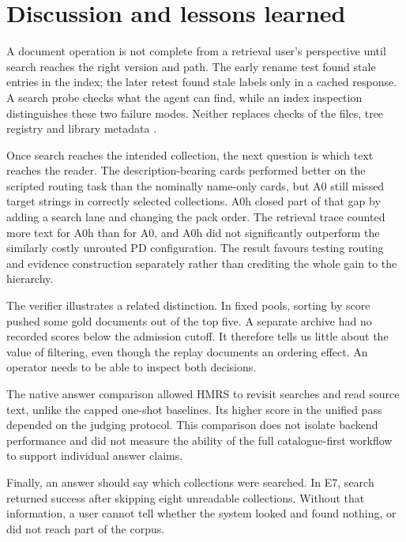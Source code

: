 \section{Discussion and lessons learned}
\label{sec:discussion}
A document operation is not complete from a retrieval user's perspective
until search reaches the right version and path. The early rename test
found stale entries in the index; the later retest found stale labels only
in a cached response. A search probe checks what the agent can find, while
an index inspection distinguishes these two failure modes. Neither
replaces checks of the files, tree registry and library metadata
\citep{park-metadata-quality-2009,paivarinta-ecm-2005}.

Once search reaches the intended collection, the next question is which
text reaches the reader. The description-bearing cards performed better
on the scripted routing task than the nominally name-only cards, but A0
still missed target strings in correctly selected collections. A0h closed
part of that gap by adding a search lane and changing the pack order. The
retrieval trace counted more text for A0h than for A0, and A0h did not
significantly outperform the similarly costly unrouted PD configuration.
The result favours testing
routing and evidence construction separately rather than crediting the
whole gain to the hierarchy.

The verifier illustrates a related distinction. In fixed pools, sorting by
score pushed some gold documents out of the top five. A separate archive
had no recorded scores below the admission cutoff. It therefore tells us
little about the value of filtering, even though the replay documents an
ordering effect. An operator needs to be able to inspect both decisions.

The native answer comparison allowed HMRS to revisit searches and read
source text, unlike the capped one-shot baselines. Its higher score in the
unified pass depended on the judging protocol. This comparison does not
isolate backend performance and did not measure the ability of the full
catalogue-first workflow to support individual answer claims.

Finally, an answer should say which collections were searched. In E7,
search returned success after skipping eight unreadable collections.
Without that information, a user cannot tell whether the system looked
and found nothing, or did not reach part of the corpus.
